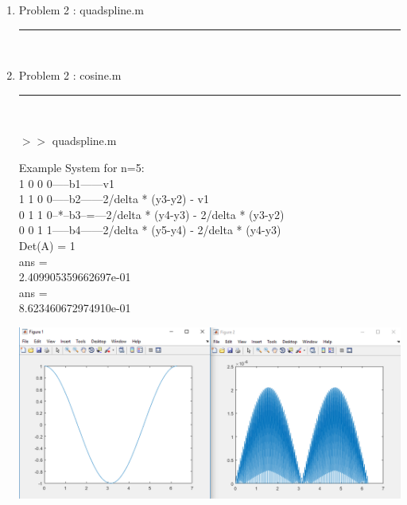 \documentclass[12pt]{article}
\begin{document}
	\begin{enumerate}
	
	\item[] Problem 2 : quadspline.m \noindent\rule{\textwidth}{1.0pt} \\
		
	
	\item[] Problem 2 : cosine.m \noindent\rule{\textwidth}{1.0pt} \\
		
	
	\pagebreak	
	
	$>>$ quadspline.m
	\begin{framed}
	Example System for n=5: \\
	1 0 0 0-----b1------v1\\
	1 1 0 0-----b2------2/delta * (y3-y2) - v1\\
	0 1 1 0--*--b3--=---2/delta * (y4-y3) - 2/delta * (y3-y2)\\
	0 0 1 1-----b4------2/delta * (y5-y4) - 2/delta * (y4-y3)\\
	
	Det(A) = 1\\

ans =\\

     2.409905359662697e-01\\


ans =\\

     8.623460672974910e-01\\
	\end{framed}
	
	\begin{center}
			\includegraphics[scale=0.55]{hw2g1}
		\end{center} 
	
	\end{enumerate}
	
	
\end{document}
